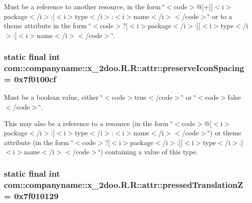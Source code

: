 Must be a reference to another resource, in the form \char`\"{}$<$code$>$@\mbox{[}+\mbox{]}\mbox{[}$<$i$>$package$<$/i$>$:\mbox{]}$<$i$>$type$<$/i$>$:$<$i$>$name$<$/i$>$$<$/code$>$\char`\"{} or to a theme attribute in the form \char`\"{}$<$code$>$?\mbox{[}$<$i$>$package$<$/i$>$:\mbox{]}\mbox{[}$<$i$>$type$<$/i$>$:\mbox{]}$<$i$>$name$<$/i$>$$<$/code$>$\char`\"{}. \hypertarget{classcom_1_1companyname_1_1x__2doo_1_1_r_1_1attr_5a394496882952d599d8a18288b55190}{
\subsubsection[{preserveIconSpacing}]{\setlength{\rightskip}{0pt plus 5cm}static final int com::companyname::x\_\-2doo.R.R::attr::preserveIconSpacing = 0x7f0100cf}}
\label{classcom_1_1companyname_1_1x__2doo_1_1_r_1_1attr_5a394496882952d599d8a18288b55190}


Must be a boolean value, either \char`\"{}$<$code$>$true$<$/code$>$\char`\"{} or \char`\"{}$<$code$>$false$<$/code$>$\char`\"{}. 

This may also be a reference to a resource (in the form \char`\"{}$<$code$>$@\mbox{[}$<$i$>$package$<$/i$>$:\mbox{]}$<$i$>$type$<$/i$>$:$<$i$>$name$<$/i$>$$<$/code$>$\char`\"{}) or theme attribute (in the form \char`\"{}$<$code$>$?\mbox{[}$<$i$>$package$<$/i$>$:\mbox{]}\mbox{[}$<$i$>$type$<$/i$>$:\mbox{]}$<$i$>$name$<$/i$>$$<$/code$>$\char`\"{}) containing a value of this type. \hypertarget{classcom_1_1companyname_1_1x__2doo_1_1_r_1_1attr_202170b7607fdf0e1a095a25cd1f11e7}{
\subsubsection[{pressedTranslationZ}]{\setlength{\rightskip}{0pt plus 5cm}static final int com::companyname::x\_\-2doo.R.R::attr::pressedTranslationZ = 0x7f010129}}
\label{classcom_1_1companyname_1_1x__2doo_1_1_r_1_1attr_202170b7607fdf0e1a095a25cd1f11e7}


